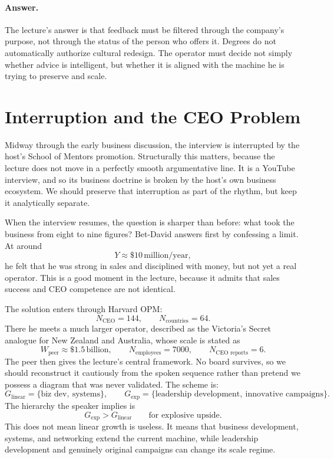 \paragraph{Answer.} The lecture's answer is that feedback must be filtered through the company's purpose, not through the status of the person who offers it. Degrees do not automatically authorize cultural redesign. The operator must decide not simply whether advice is intelligent, but whether it is aligned with the machine he is trying to preserve and scale.

\section{Interruption and the CEO Problem}

Midway through the early business discussion, the interview is interrupted by the host's School of Mentors promotion. Structurally this matters, because the lecture does not move in a perfectly smooth argumentative line. It is a YouTube interview, and so its business doctrine is broken by the host's own business ecosystem. We should preserve that interruption as part of the rhythm, but keep it analytically separate.

When the interview resumes, the question is sharper than before: what took the business from eight to nine figures? Bet-David answers first by confessing a limit. At around
\begin{equation}
Y \approx \$10\,\text{million/year},
\end{equation}
he felt that he was strong in sales and disciplined with money, but not yet a real operator. This is a good moment in the lecture, because it admits that sales success and CEO competence are not identical.

The solution enters through Harvard OPM:
\begin{equation}
N_{\text{CEO}}=144,\qquad N_{\text{countries}}=64.
\end{equation}
There he meets a much larger operator, described as the Victoria's Secret analogue for New Zealand and Australia, whose scale is stated as
\begin{equation}
W_{\text{peer}} \approx \$1.5\,\text{billion},\qquad
N_{\text{employees}}=7000,\qquad
N_{\text{CEO reports}}=6.
\end{equation}
The peer then gives the lecture's central framework. No board survives, so we should reconstruct it cautiously from the spoken sequence rather than pretend we possess a diagram that was never validated. The scheme is:
\begin{equation}
G_{\text{linear}}=\{\text{biz dev},\ \text{systems}\},\qquad
G_{\text{exp}}=\{\text{leadership development},\ \text{innovative campaigns}\}.
\end{equation}
The hierarchy the speaker implies is
\begin{equation}
G_{\text{exp}} > G_{\text{linear}}
\qquad\text{for explosive upside.}
\end{equation}
This does not mean linear growth is useless. It means that business development, systems, and networking extend the current machine, while leadership development and genuinely original campaigns can change its scale regime.


